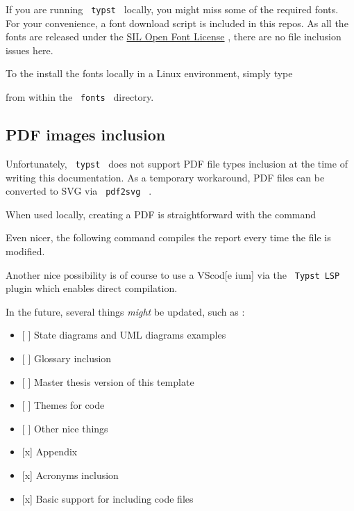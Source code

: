 If you are running \texttt{\ typst\ } locally, you might miss some of
the required fonts. For your convenience, a font download script is
included in this repos. As all the fonts are released under the
\href{https://openfontlicense.org/}{SIL Open Font License} , there are
no file inclusion issues here.

To the install the fonts locally in a Linux environment, simply type

\begin{Shaded}
\begin{Highlighting}[]
\end{Highlighting}
\end{Shaded}

from within the \texttt{\ fonts\ } directory.

\subsection{PDF images inclusion}\label{pdf-images-inclusion}

Unfortunately, \texttt{\ typst\ } does not support PDF file types
inclusion at the time of writing this documentation. As a temporary
workaround, PDF files can be converted to SVG via \texttt{\ pdf2svg\ } .

When used locally, creating a PDF is straightforward with the command

\begin{Shaded}
\begin{Highlighting}[]
\end{Highlighting}
\end{Shaded}

Even nicer, the following command compiles the report every time the
file is modified.

\begin{Shaded}
\begin{Highlighting}[]
\end{Highlighting}
\end{Shaded}

Another nice possibility is of course to use a VScod{[}e \textbar{}
ium{]} via the \texttt{\ Typst\ LSP\ } plugin which enables direct
compilation.

In the future, several things \emph{might} be updated, such as :

\begin{itemize}
\tightlist
\item
  {[} {]} State diagrams and UML diagrams examples
\item
  {[} {]} Glossary inclusion
\item
  {[} {]} Master thesis version of this template
\item
  {[} {]} Themes for code
\item
  {[} {]} Other nice things
\item
  {[}x{]} Appendix
\item
  {[}x{]} Acronyms inclusion
\item
  {[}x{]} Basic support for including code files
\end{itemize}

